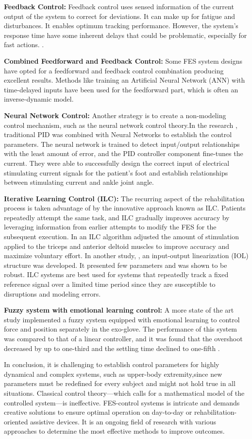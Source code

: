 \textbf{Feedback Control:} Feedback control uses sensed information of the current output of the system to correct for deviations. It can make up for fatigue and disturbances. It enables optimum tracking performance. However, the system's response time have some inherent delays that could be problematic, especially for fast actions. \cite{CFF}.

\textbf{Combined Feedforward and Feedback Control:} Some FES system designs have opted for a feedforward and feedback control combination producing excellent results. Methods like training an Artificial Neural Network (ANN) with time-delayed inputs have been used for the feedforward part, which is often an inverse-dynamic model.

\textbf{Neural Network Control:} Another strategy is to create a non-modeling control mechanism, such as the neural network control theory.In the research \cite{NNPID}, traditional PID was combined with Neural Networks to establish the control parameters. The neural network is trained to detect input/output relationships with the least amount of error, and the PID controller component fine-tunes the current. They were able to successfully design the correct input of electrical stimulating current signals for the patient's foot and establish relationships between stimulating current and ankle joint angle. 

\textbf{Iterative Learning Control (ILC):} The recurring aspect of the rehabilitation process is taken advantage of by the innovative approach known as ILC. Patients repeatedly attempt the same task, and ILC gradually improves accuracy by leveraging information from earlier attempts to modify the FES for the subsequent execution. In \cite{FESILC} an ILC algorithm adjusted the amount of stimulation applied to the triceps and anterior deltoid muscles to improve accuracy and maximize voluntary effort. In another study, \cite{IOL}, an input-output linearization (IOL) structure was developed. It presented few parameters and was shown to be robust.  ILC systems are best used for systems that repeatedly track a fixed reference signal over a limited time period since they are susceptible to disruptions and modeling errors.

\textbf{Fuzzy system with emotional learning control:} A more state of the art study implemented a fuzzy system equipped with emotional learning to control force and position separately in the exo-glove. The performance of this system was compared to that of a linear controller, and it was found that the overshoot decreased by up to one-third and the settling time declined to one-fifth \cite{FZC}.


In conclusion, it is challenging to establish control parameters for highly dynamical and complex systems, such as upper-body extremity,since new parameters must be redefined for every subject and might not hold true in all situations. Classical control theory—which calls for a mathematical model of the controlled system—is ineffective. FES-control systems is intricate and demands creative solutions to ensure optimal operation on day-to-day or rehabilitation-oriented assistive devices.  It is an ongoing field of research with various approaches to determine the most effective methods to improve outcomes.